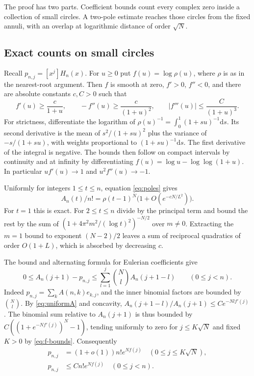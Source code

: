 \documentclass[11pt]{article}
\newcommand{\dd}{\mathrm d}
\begin{document}
The proof has two parts. Coefficient bounds count every complex zero inside a collection of small circles. A two-pole estimate reaches those circles from the fixed annuli, with an overlap at logarithmic distance of order \(\sqrt N\).

\subsection{Exact counts on small circles}

Recall \(p_{n,j}=[x^j]H_n(x)\). For \(u\ge0\) put \(f(u)=\log\rho(u)\), where \(\rho\) is as in the nearest-root argument. Then \(f\) is smooth at zero, \(f'>0\), \(f''<0\), and there are absolute constants \(c,C>0\) such that
\begin{equation}\label{eq:f-bounds}
 f'(u)\ge\frac{c}{1+u},\qquad -f''(u)\ge\frac{c}{(1+u)^2},\qquad
 |f'''(u)|\le\frac{C}{(1+u)^3}.
\end{equation}
For strictness, differentiate the logarithm of \(\rho(u)^{-1}=\int_0^1(1+su)^{-1}\dd s\). Its second derivative is the mean of \(s^2/(1+su)^2\) plus the variance of \(-s/(1+su)\), with weights proportional to \((1+su)^{-1}\dd s\). The first derivative of the integral is negative. The bounds then follow on compact intervals by continuity and at infinity by differentiating \(f(u)=\log u-\log\log(1+u)\). In particular \(u f'(u)\to1\) and \(u^2 f''(u)\to-1\).

Uniformly for integers \(1\le t\le n\), equation \eqref{eq:poles} gives
\begin{equation}\label{eq:uniformA}
 A_n(t)/n!=\rho(t-1)^N\bigl(1+O(e^{-cN/L^2})\bigr).
\end{equation}
For \(t=1\) this is exact. For \(2\le t\le n\) divide by the principal term and bound the rest by the sum of \((1+4\pi^2m^2/(\log t)^2)^{-N/2}\) over \(m\ne0\). Extracting the \(m=1\) bound to exponent \((N-2)/2\) leaves a sum of reciprocal quadratics of order \(O(1+L)\), which is absorbed by decreasing \(c\).

The bound and alternating formula for Eulerian coefficients give
\[
 0\le A_n(j+1)-p_{n,j}\le\sum_{l=1}^j\binom Nl A_n(j+1-l)
 \qquad(0\le j<n).
\]
Indeed \(p_{n,j}=\sum_k A(n,k)e_{k,j}\), and the inner binomial factors are bounded by \(\binom Nl\). By \eqref{eq:uniformA} and concavity, \(A_n(j+1-l)/A_n(j+1)\le C e^{-Nl f'(j)}\). The binomial sum relative to \(A_n(j+1)\) is thus bounded by \(C((1+e^{-Nf'(j)})^N-1)\), tending uniformly to zero for \(j\le K\sqrt N\) and fixed \(K>0\) by \eqref{eq:f-bounds}. Consequently
\begin{equation}\label{eq:smallcoef}
 \begin{split}
 p_{n,j}&=(1+o(1))n! e^{Nf(j)}\quad(0\le j\le K\sqrt N),\\
 p_{n,j}&\le C n!e^{Nf(j)}\quad(0\le j<n).
 \end{split}
\end{equation}
\end{document}
